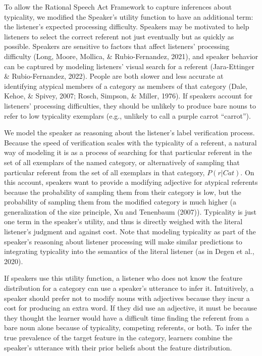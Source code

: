 \documentclass[
  english,
  man,floatsintext]{apa6}
\begin{document}
To allow the Rational Speech Act Framework to capture inferences about typicality, we modified the Speaker's utility function to have an additional term: the listener's expected processing difficulty. Speakers may be motivated to help listeners to select the correct referent not just eventually but as quickly as possible. Speakers are sensitive to factors that affect listeners' processing difficulty (Long, Moore, Mollica, \& Rubio-Fernandez, 2021), and speaker behavior can be captured by modeling listeners' visual search for a referent (Jara-Ettinger \& Rubio-Fernandez, 2022). People are both slower and less accurate at identifying atypical members of a category as members of that category (Dale, Kehoe, \& Spivey, 2007; Rosch, Simpson, \& Miller, 1976). If speakers account for listeners' processing difficulties, they should be unlikely to produce bare nouns to refer to low typicality exemplars (e.g., unlikely to call a purple carrot ``carrot'').

We model the speaker as reasoning about the listener's label verification process. Because the speed of verification scales with the typicality of a referent, a natural way of modeling it is as a process of searching for that particular referent in the set of all exemplars of the named category, or alternatively of sampling that particular referent from the set of all exemplars in that category, \(P\left(r \vert Cat\right)\). On this account, speakers want to provide a modifying adjective for atypical referents because the probability of sampling them from their category is low, but the probability of sampling them from the modified category is much higher (a generalization of the size principle, Xu and Tenenbaum (2007)). Typicality is just one term in the speaker's utility, and thus is directly weighed with the literal listener's judgment and against cost. Note that modeling typicality as part of the speaker's reasoning about listener processing will make similar predictions to integrating typicality into the semantics of the literal listener (as in Degen et al., 2020).

If speakers use this utility function, a listener who does not know the feature distribution for a category can use a speaker's utterance to infer it. Intuitively, a speaker should prefer not to modify nouns with adjectives because they incur a cost for producing an extra word. If they did use an adjective, it must be because they thought the learner would have a difficult time finding the referent from a bare noun alone because of typicality, competing referents, or both. To infer the true prevalence of the target feature in the category, learners combine the speaker's utterance with their prior beliefs about the feature distribution.
\end{document}
